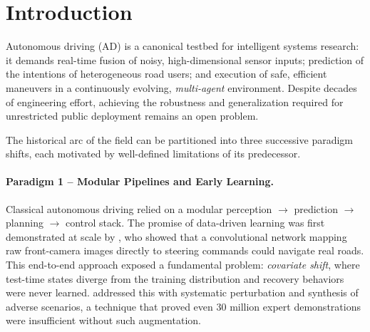 \documentclass[12pt, a4paper]{article}
\begin{document}
\newpage
\tableofcontents
\newpage

\section{Introduction}
\label{sec:intro}

Autonomous driving (AD) is a canonical testbed for intelligent systems research: it
demands real-time fusion of noisy, high-dimensional sensor inputs; prediction of the
intentions of heterogeneous road users; and execution of safe, efficient maneuvers
in a continuously evolving, \emph{multi-agent} environment. Despite decades of
engineering effort, achieving the robustness and generalization required for
unrestricted public deployment remains an open problem.

The historical arc of the field can be partitioned into three successive paradigm
shifts, each motivated by well-defined limitations of its predecessor.

\paragraph{Paradigm 1 -- Modular Pipelines and Early Learning.}
Classical autonomous driving relied on a modular perception $\to$ prediction
$\to$ planning $\to$ control stack. The promise of data-driven learning was first
demonstrated at scale by \citet{bojarski2016end}, who showed that a convolutional
network mapping raw front-camera images directly to steering commands could
navigate real roads. This end-to-end approach exposed a fundamental problem:
\emph{covariate shift}, where test-time states diverge from the training distribution
and recovery behaviors were never learned. \citet{bansal2018chauffeur} addressed
this with systematic perturbation and synthesis of adverse scenarios, a technique
that proved even 30 million expert demonstrations were insufficient without such
augmentation.
\end{document}
